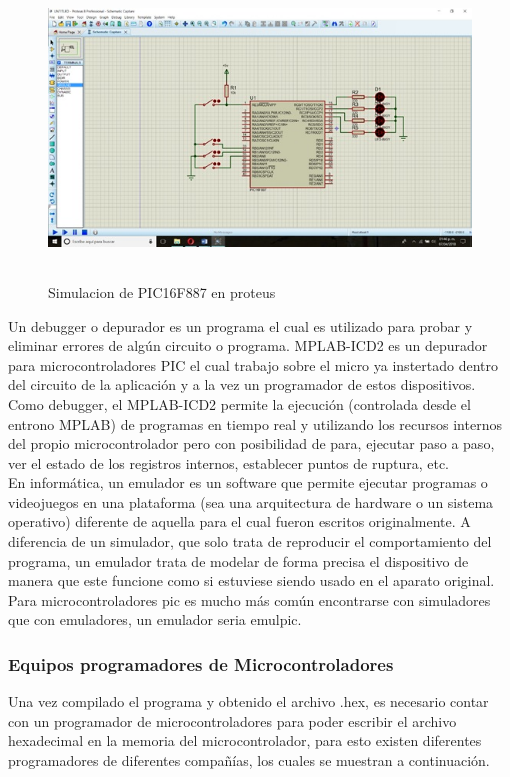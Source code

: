 \documentclass[12pt,a4paper]{article}
\begin{document}
   \begin{figure}[htpb]
   \centering
   \includegraphics[height=8cm]{screenProteus}
   \caption{Simulacion de PIC16F887 en proteus}
   \label{fig:ssProteus}
   \end{figure}
   
   Un debugger o depurador es un programa el cual es utilizado para probar y eliminar errores de algún circuito o programa. MPLAB-ICD2 es un depurador para microcontroladores PIC el cual trabajo sobre el micro ya instertado dentro del circuito de la aplicación y a la vez un programador de estos dispositivos.\\
   Como debugger, el MPLAB-ICD2 permite la ejecución (controlada desde el entrono MPLAB) de programas en tiempo real y utilizando los recursos internos del propio microcontrolador pero con posibilidad de para, ejecutar paso a paso, ver el estado de los registros internos, establecer puntos de ruptura, etc.\\
   En informática, un emulador es un software que permite ejecutar programas o videojuegos en una plataforma (sea una arquitectura de hardware o un sistema operativo) diferente de aquella para el cual fueron escritos originalmente. A diferencia de un simulador, que solo trata de reproducir el comportamiento del programa, un emulador trata de modelar de forma precisa el dispositivo de manera que este funcione como si estuviese siendo usado en el aparato original.\\
   Para microcontroladores pic es mucho más común encontrarse con simuladores que con emuladores, un emulador seria emulpic.
   
   \subsubsection{Equipos programadores de Microcontroladores}
   Una vez compilado el programa y obtenido el archivo .hex, es necesario contar con un programador de microcontroladores para poder escribir el archivo hexadecimal en la memoria del microcontrolador, para esto existen diferentes programadores de diferentes compañías, los cuales se muestran a continuación.
   
\end{document}

